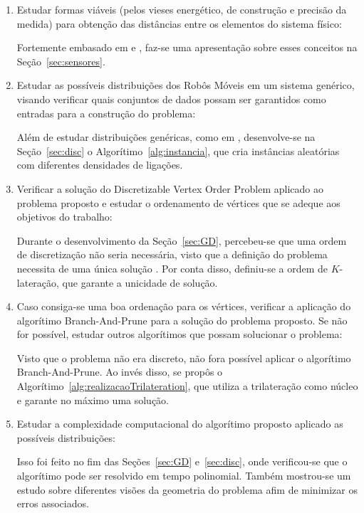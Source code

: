 \documentclass[a4paper,12pt]{report}
\begin{document}
	\begin{enumerate}
		
		\item Estudar formas viáveis (pelos vieses energético, de construção e precisão da medida) para obtenção das distâncias entre os elementos do sistema físico:
		
		Fortemente embasado em \cite{savvides2001dynamic} e \cite{sensorsForMobileRobots}, faz-se uma apresentação sobre esses conceitos na Seção~\ref{sec:sensores}. 
		
		\item Estudar as possíveis distribuições dos Robôs Móveis em um sistema genérico, visando verificar quais conjuntos de dados possam ser garantidos como entradas para a construção do problema:
		
		Além de estudar distribuições genéricas, como em \cite{eren2004rigidity}, desenvolve-se na Seção~\ref{sec:disc} o Algorítimo~\ref{alg:instancia}, que cria instâncias aleatórias com diferentes densidades de ligações.
		
		\item Verificar a solução do Discretizable Vertex Order Problem \cite{carlileGDandAplications} aplicado ao problema proposto e estudar o ordenamento de vértices que se adeque aos objetivos do trabalho:
		
		Durante o desenvolvimento da Seção~\ref{sec:GD}, percebeu-se que uma ordem de discretização não seria necessária, visto que a definição do problema necessita de uma única solução \cite{libertiEDG}. Por conta disso, definiu-se a ordem de $K$-lateração, que garante a unicidade de solução.
		
		\item Caso consiga-se uma boa ordenação para os vértices, verificar a aplicação do algorítimo Branch-And-Prune \cite{carlile:BP} para a solução do problema proposto. Se não for possível, estudar outros algorítimos que possam solucionar o problema:
		
		Visto que o problema não era discreto, não fora possível aplicar o algorítimo Branch-And-Prune. Ao invés disso, se propôs o Algorítimo~\ref{alg:realizacaoTrilateration}, que utiliza a trilateração como núcleo e garante no máximo uma solução.
		
		\item Estudar a complexidade computacional do algorítimo proposto aplicado as possíveis distribuições:
		
		Isso foi feito no fim das Seções~\ref{sec:GD} e~\ref{sec:disc}, onde verificou-se que o algorítimo pode ser resolvido em tempo polinomial. Também mostrou-se um estudo sobre diferentes visões da geometria do problema afim de minimizar os erros associados. 
		

\end{enumerate}
\end{document}
